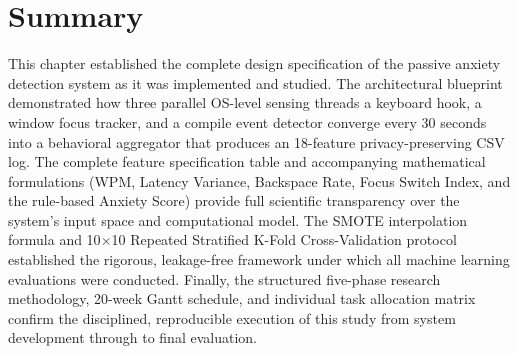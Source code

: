 \section{Summary}
\label{sec:ch3_summary}

This chapter established the complete design specification of the passive anxiety detection system as it was implemented and studied. The architectural blueprint demonstrated how three parallel OS-level sensing threads a keyboard hook, a window focus tracker, and a compile event detector converge every 30 seconds into a behavioral aggregator that produces an 18-feature privacy-preserving CSV log. The complete feature specification table and accompanying mathematical formulations (WPM, Latency Variance, Backspace Rate, Focus Switch Index, and the rule-based Anxiety Score) provide full scientific transparency over the system's input space and computational model. The SMOTE interpolation formula and 10$\times$10 Repeated Stratified K-Fold Cross-Validation protocol established the rigorous, leakage-free framework under which all machine learning evaluations were conducted. Finally, the structured five-phase research methodology, 20-week Gantt schedule, and individual task allocation matrix confirm the disciplined, reproducible execution of this study from system development through to final evaluation.